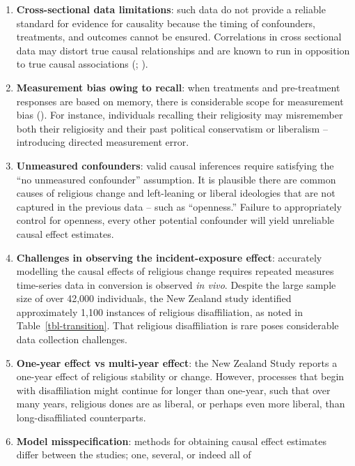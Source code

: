 \documentclass[
  singlecolumn]{article}
\begin{document}
\begin{enumerate}
\def\labelenumi{\arabic{enumi}.}
\item
  \textbf{Cross-sectional data limitations}: such data do not provide a
  reliable standard for evidence for causality because the timing of
  confounders, treatments, and outcomes cannot be ensured. Correlations
  in cross sectional data may distort true causal relationships and are
  known to run in opposition to true causal associations
  (;
  ).
\item
  \textbf{Measurement bias owing to recall}: when treatments and
  pre-treatment responses are based on memory, there is considerable
  scope for measurement bias
  (). For
  instance, individuals recalling their religiosity may misremember both
  their religiosity and their past political conservatism or liberalism
  -- introducing directed measurement error.
\item
  \textbf{Unmeasured confounders}: valid causal inferences require
  satisfying the ``no unmeasured confounder'' assumption. It is
  plausible there are common causes of religious change and left-leaning
  or liberal ideologies that are not captured in the previous data --
  such as ``openness.'' Failure to appropriately control for openness,
  every other potential confounder will yield unreliable causal effect
  estimates.
\item
  \textbf{Challenges in observing the incident-exposure effect}:
  accurately modelling the causal effects of religious change requires
  repeated measures time-series data in conversion is observed \emph{in
  vivo}. Despite the large sample size of over 42,000 individuals, the
  New Zealand study identified approximately 1,100 instances of
  religious disaffiliation, as noted in Table~\ref{tbl-transition}. That
  religious disaffiliation is rare poses considerable data collection
  challenges.
\item
  \textbf{One-year effect vs multi-year effect}: the New Zealand Study
  reports a one-year effect of religious stability or change. However,
  processes that begin with disaffiliation might continue for longer
  than one-year, such that over many years, religious dones are as
  liberal, or perhaps even more liberal, than long-disaffiliated
  counterparts.
\item
  \textbf{Model misspecification}: methods for obtaining causal effect
  estimates differ between the studies; one, several, or indeed all of

\end{enumerate}
\end{document}
